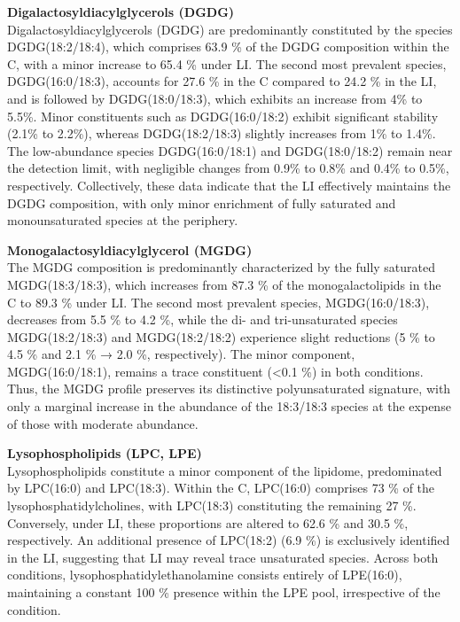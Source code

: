 \documentclass[10pt,letterpaper]{article}
\begin{document}
\textbf{Digalactosyldiacylglycerols (DGDG)}  \\
Digalactosyldiacylglycerols (DGDG) are predominantly constituted by the species DGDG(18:2/18:4), which comprises 63.9 \% of the DGDG composition within the C, with a minor increase to 65.4 \% under LI. The second most prevalent species, DGDG(16:0/18:3), accounts for 27.6 \% in the C  compared to 24.2 \% in the LI, and is followed by DGDG(18:0/18:3), which exhibits an increase from 4\% to 5.5\%. Minor constituents such as DGDG(16:0/18:2) exhibit significant stability (2.1\% to 2.2\%), whereas DGDG(18:2/18:3) slightly increases from 1\% to 1.4\%. The low-abundance species DGDG(16:0/18:1) and DGDG(18:0/18:2) remain near the detection limit, with negligible changes from 0.9\% to 0.8\% and 0.4\% to 0.5\%, respectively. Collectively, these data indicate that the LI effectively maintains the DGDG composition, with only minor enrichment of fully saturated and monounsaturated species at the periphery.

\textbf{Monogalactosyldiacylglycerol (MGDG)} \\
The MGDG composition is predominantly characterized by the fully saturated MGDG(18:3/18:3), which increases from 87.3 \% of the monogalactolipids in the C to 89.3 \% under LI. The second most prevalent species, MGDG(16:0/18:3), decreases from 5.5 \% to 4.2 \%, while the di- and tri-unsaturated species MGDG(18:2/18:3) and MGDG(18:2/18:2) experience slight reductions (5 \% to 4.5 \% and 2.1 \% → 2.0 \%, respectively). The minor component, MGDG(16:0/18:1), remains a trace constituent (<0.1 \%) in both conditions. Thus, the MGDG profile preserves its distinctive polyunsaturated signature, with only a marginal increase in the abundance of the 18:3/18:3 species at the expense of those with moderate abundance.

\textbf{Lysophospholipids (LPC, LPE)} \\
Lysophospholipids constitute a minor component of the lipidome, predominated by LPC(16:0) and LPC(18:3). Within the C, LPC(16:0) comprises 73 \% of the lysophosphatidylcholines, with LPC(18:3) constituting the remaining 27 \%. Conversely, under LI, these proportions are altered to 62.6 \% and 30.5 \%, respectively. An additional presence of LPC(18:2) (6.9 \%) is exclusively identified in the LI, suggesting that LI may reveal trace unsaturated species. Across both conditions, lysophosphatidylethanolamine consists entirely of LPE(16:0), maintaining a constant 100 \% presence within the LPE pool, irrespective of the condition.
\end{document}
